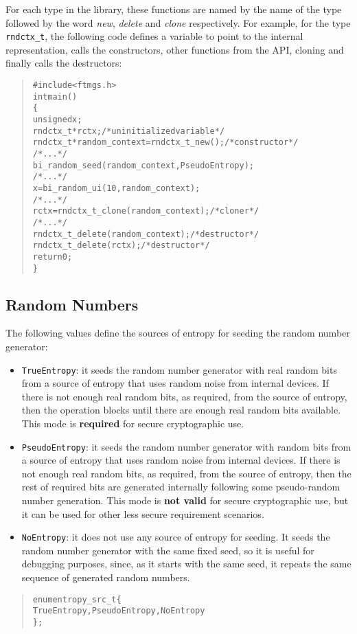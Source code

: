 \documentclass[a4paper]{article}
\newenvironment{code}%
{\begin{quote}\footnotesize\begin{alltt}}%
{\end{alltt}\end{quote}}%
\begin{document}
For each type in the library, these functions are named by the name of
the type followed by the word \emph{new}, \emph{delete} and
\emph{clone} respectively. For example, for the type \verb|rndctx_t|,
the following code defines a variable to point to the internal
representation, calls the constructors, other functions from the API,
cloning and finally calls the destructors:
\begin{code}
#include <ftmgs.h>
int main()
\{
    unsigned x;
    rndctx_t* rctx;                             /* uninitialized variable */
    rndctx_t* random_context = rndctx_t_new();  /* constructor */
    /* ... */
    bi_random_seed(random_context, PseudoEntropy);
    /* ... */
    x = bi_random_ui(10, random_context);
    /* ... */
    rctx = rndctx_t_clone(random_context);      /* cloner     */
    /* ... */
    rndctx_t_delete(random_context);            /* destructor */
    rndctx_t_delete(rctx);                      /* destructor */
    return 0;
\}
\end{code}

\subsection{Random Numbers}

The following values define the sources of entropy for seeding the
random number generator:

{\footnotesize\begin{itemize}%
\item \verb|TrueEntropy|: it seeds the random number generator with
  real random bits from a source of entropy that uses random noise
  from internal devices. If there is not enough real random bits, as
  required, from the source of entropy, then the operation blocks
  until there are enough real random bits available. This mode is
  \textbf{required} for secure cryptographic use.
\item \verb|PseudoEntropy|: it seeds the random number generator with
  random bits from a source of entropy that uses random noise from
  internal devices. If there is not enough real random bits, as
  required, from the source of entropy, then the rest of required bits
  are generated internally following some pseudo-random number
  generation. This mode is \textbf{not valid} for secure cryptographic
  use, but it can be used for other less secure requirement scenarios.
\item \verb|NoEntropy|: it does not use any source of entropy for
  seeding. It seeds the random number generator with the same fixed
  seed, so it is useful for debugging purposes, since, as it starts
  with the same seed, it repeats the same sequence of generated random
  numbers.
\end{itemize}}%
\begin{code}
enum entropy_src_t \{
    TrueEntropy, PseudoEntropy, NoEntropy
\};
\end{code}
\end{document}

